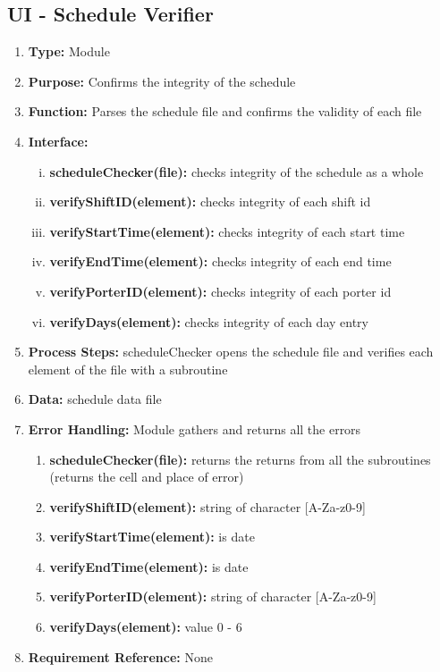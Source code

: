\documentclass[paper=letter, fontsize=10pt]{scrartcl}
\numberwithin{equation}{section}		%
\numberwithin{figure}{section}			%
\numberwithin{table}{section}				%
\begin{document}
\subsection{UI - Schedule Verifier}
\begin{enumerate}[]
	\item \textbf{Type:} Module
	\item \textbf{Purpose:} Confirms the integrity of the schedule
	\item \textbf{Function:} Parses the schedule file and confirms the validity of each file
	\item \textbf{Interface:} 
	\begin{enumerate}[(i)]
		\item \textbf{scheduleChecker(file):} checks integrity of the schedule as a whole
		\item \textbf{verifyShiftID(element):} checks integrity of each shift id  
		\item \textbf{verifyStartTime(element):} checks integrity of each start time 
		\item \textbf{verifyEndTime(element):} checks integrity of each end time 
		\item \textbf{verifyPorterID(element):} checks integrity of each porter id 
		\item \textbf{verifyDays(element):} checks integrity of each day entry
	\end{enumerate}
	\item \textbf{Process Steps:} scheduleChecker opens the schedule file and verifies each element of the file with a subroutine
	\item \textbf{Data:} schedule data file
	\item \textbf{Error Handling:} Module gathers and returns all the errors
	\begin{enumerate}[]
		\item \textbf{scheduleChecker(file):} returns the returns from all the subroutines (returns the cell and place of error)
		\item \textbf{verifyShiftID(element):} string of character [A-Za-z0-9] 
		\item \textbf{verifyStartTime(element):} is date
		\item \textbf{verifyEndTime(element):} is date
		\item \textbf{verifyPorterID(element):} string of character [A-Za-z0-9] 
		\item \textbf{verifyDays(element):} value 0 - 6
	\end{enumerate}
	\item \textbf{Requirement Reference:} None
\end{enumerate}
\end{document}
